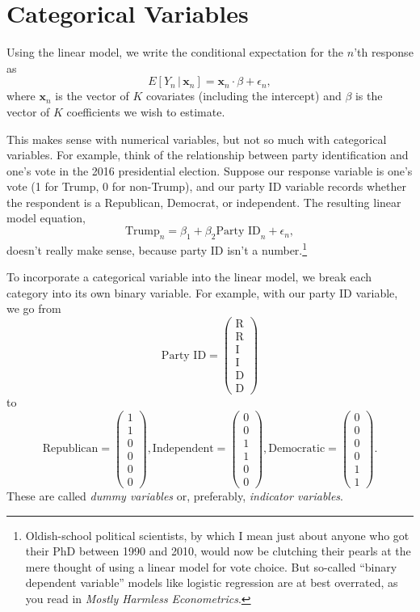 \documentclass[
  12pt,
  oneside,openany]{book}
\begin{document}
\hypertarget{categorical-variables}{%
\section{Categorical Variables}\label{categorical-variables}}

Using the linear model, we write the conditional expectation for the \(n\)'th response as
\[
E[Y_n \,|\, \mathbf{x}_n] = \mathbf{x}_n \cdot \beta + \epsilon_n,
\]
where \(\mathbf{x}_n\) is the vector of \(K\) covariates (including the intercept) and \(\beta\) is the vector of \(K\) coefficients we wish to estimate.

This makes sense with numerical variables, but not so much with categorical variables. For example, think of the relationship between party identification and one's vote in the 2016 presidential election. Suppose our response variable is one's vote (1 for Trump, 0 for non-Trump), and our party ID variable records whether the respondent is a Republican, Democrat, or independent. The resulting linear model equation,
\[
\text{Trump}_n = \beta_1 + \beta_2 \text{Party ID}_n + \epsilon_n,
\]
doesn't really make sense, because party ID isn't a number.\footnote{Oldish-school political scientists, by which I mean just about anyone who got their PhD between 1990 and 2010, would now be clutching their pearls at the mere thought of using a linear model for vote choice. But so-called ``binary dependent variable'' models like logistic regression are at best overrated, as you read in \emph{Mostly Harmless Econometrics}.}

To incorporate a categorical variable into the linear model, we break each category into its own binary variable. For example, with our party ID variable, we go from
\[
\text{Party ID} = \begin{pmatrix}
\text{R} \\
\text{R} \\
\text{I} \\
\text{I} \\
\text{D} \\
\text{D}
\end{pmatrix}
\]
to
\[
\text{Republican} = \begin{pmatrix} 1 \\ 1 \\ 0 \\ 0 \\ 0 \\ 0 \end{pmatrix},
\text{Independent} = \begin{pmatrix} 0 \\ 0 \\ 1 \\ 1 \\ 0 \\ 0 \end{pmatrix},
\text{Democratic} = \begin{pmatrix} 0 \\ 0 \\ 0 \\ 0 \\ 1 \\ 1 \end{pmatrix}.
\]
These are called \emph{dummy variables} or, preferably, \emph{indicator variables}.
\end{document}
